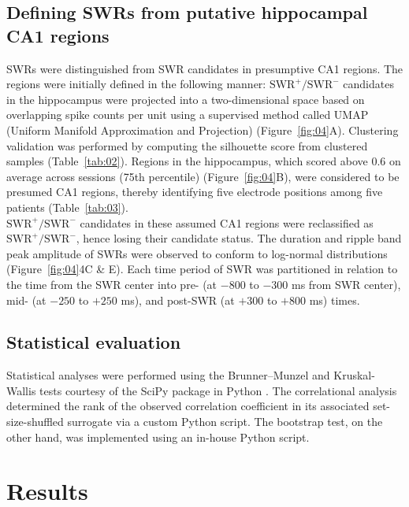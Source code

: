 \documentclass[final,3p,times,twocolumn]{elsarticle}
\begin{document}
\subsection{Defining SWRs from putative hippocampal CA1 regions}
SWRs were distinguished from SWR candidates in presumptive CA1 regions. The regions were initially defined in the following manner: $\textrm{SWR}^+/\textrm{SWR}^-$ candidates in the hippocampus were projected into a two-dimensional space based on overlapping spike counts per unit using a supervised method called UMAP (Uniform Manifold Approximation and Projection) \cite{mcinnes_umap_2018} (Figure~\ref{fig:04}A). Clustering validation was performed by computing the silhouette score \cite{rousseeuw_silhouettes_1987} from clustered samples (Table~\ref{tab:02}). Regions in the hippocampus, which scored above 0.6 on average across sessions (75th percentile) (Figure~\ref{fig:04}B), were considered to be presumed CA1 regions, thereby identifying five electrode positions among five patients (Table~\ref{tab:03}).
\\
\indent
$\textrm{SWR}^+/\textrm{SWR}^-$ candidates in these assumed CA1 regions were reclassified as $\textrm{SWR}^+/\textrm{SWR}^-$, hence losing their candidate status. The duration and ripple band peak amplitude of SWRs were observed to conform to log-normal distributions (Figure~\ref{fig:04}4C \& E). Each time period of SWR was partitioned in relation to the time from the SWR center into pre- (at $-800$ to $-300$ ms from SWR center), mid- (at $-250$ to $+250$ ms), and post-SWR (at $+300$ to $+800$ ms) times.

\subsection{Statistical evaluation}
Statistical analyses were performed using the Brunner--Munzel and Kruskal-Wallis tests courtesy of the SciPy package in Python \cite{virtanen_scipy_2020}. The correlational analysis determined the rank of the observed correlation coefficient in its associated set-size-shuffled surrogate via a custom Python script. The bootstrap test, on the other hand, was implemented using an in-house Python script.

\label{sec:methods}
\section{Results}
\end{document}

